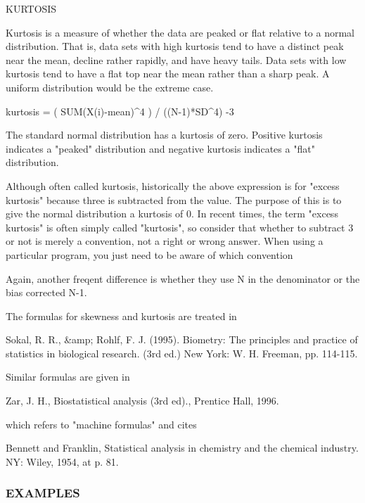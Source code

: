 K\+U\+R\+T\+O\+S\+IS \begin{DoxyVerb}   Kurtosis is a measure of whether the data are peaked
   or flat relative to a normal distribution. That is,
   data sets with high kurtosis tend to have a distinct
   peak near the mean, decline rather rapidly, and have
   heavy tails. Data sets with low kurtosis tend to have a
   flat top near the mean rather than a sharp peak. A
   uniform distribution would be the extreme case.

      kurtosis = ( SUM{(X(i)-mean)^4} ) / ((N-1)*SD^4) -3

   The standard normal distribution has a kurtosis of
   zero. Positive kurtosis indicates a "peaked"
   distribution and negative kurtosis indicates a "flat"
   distribution.

 Although often called kurtosis, historically the above expression is
 for "excess kurtosis" because three is subtracted from the value.
 The purpose of this is to give the normal distribution a kurtosis
 of 0. In recent times, the term "excess kurtosis" is often simply
 called "kurtosis", so consider that whether to subtract 3 or not
 is merely a convention, not a right or wrong answer. When using a
 particular program, you just need to be aware of which convention

 Again, another freqent difference is whether they use N in
 the denominator or the bias corrected N-1.

 The formulas for skewness and kurtosis are treated in

    Sokal, R. R., &amp; Rohlf, F. J. (1995).
    Biometry: The principles and practice of statistics in biological
    research. (3rd ed.) New York: W. H. Freeman, pp. 114-115.

 Similar formulas are given in

    Zar, J. H., Biostatistical analysis (3rd ed)., Prentice
    Hall, 1996.

 which refers to "machine formulas" and cites

    Bennett and Franklin, Statistical analysis in chemistry and
    the chemical industry. NY: Wiley, 1954, at p. 81.
\end{DoxyVerb}
 \subsubsection*{E\+X\+A\+M\+P\+L\+ES}\mbox{\label{namespacem__math_a14a1fd06462e345989ff976aac03f18d}} 
